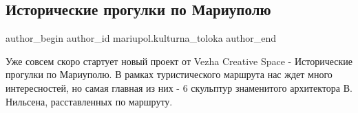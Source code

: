  
 
 
 
 

\subsection{Исторические прогулки по Мариуполю}
\label{sec:31_01_2019.fb.mariupol.kulturna_toloka.1.istoricheskie_progulki_po_mariupolju}

\ifcmt
 author_begin
   author_id mariupol.kulturna_toloka
 author_end
\fi

Уже совсем скоро стартует новый проект от Vezha Creative Space - Исторические
прогулки по Мариуполю. В рамках туристического маршрута нас ждет много
интересностей, но самая главная из них - 6 скульптур знаменитого архитектора В.
Нильсена, расставленных по маршруту.
